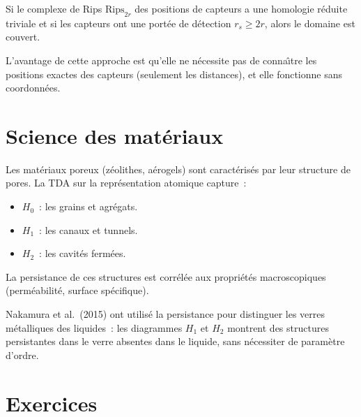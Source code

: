 \begin{theoreme}
Si le complexe de Rips $\mathrm{Rips}_{2r}$ des positions de
capteurs a une homologie r\'eduite triviale et si les capteurs
ont une port\'ee de d\'etection $r_s \geq 2r$, alors le domaine
est couvert.
\end{theoreme}

\begin{remarque}
L'avantage de cette approche est qu'elle ne n\'ecessite pas de
conna\^\i tre les positions exactes des capteurs (seulement les
distances), et elle fonctionne sans coordonn\'ees.
\end{remarque}

\section{Science des mat\'eriaux}
\label{sec:materiaux}

\begin{exemple}
Les mat\'eriaux poreux (z\'eolithes, a\'erogels) sont caract\'eris\'es
par leur structure de pores. La TDA sur la repr\'esentation atomique
capture~:
\begin{itemize}
  \item $H_0$~: les grains et agr\'egats.
  \item $H_1$~: les canaux et tunnels.
  \item $H_2$~: les cavit\'es ferm\'ees.
\end{itemize}
La persistance de ces structures est corr\'el\'ee aux propri\'et\'es
macroscopiques (perm\'eabilit\'e, surface sp\'ecifique).
\end{exemple}

\begin{exemple}
Nakamura et al.\ (2015) ont utilis\'e la persistance pour distinguer
les verres m\'etalliques des liquides~: les diagrammes $H_1$ et $H_2$
montrent des structures persistantes dans le verre absentes dans le
liquide, sans n\'ecessiter de param\`etre d'ordre.
\end{exemple}

\section{Exercices}

